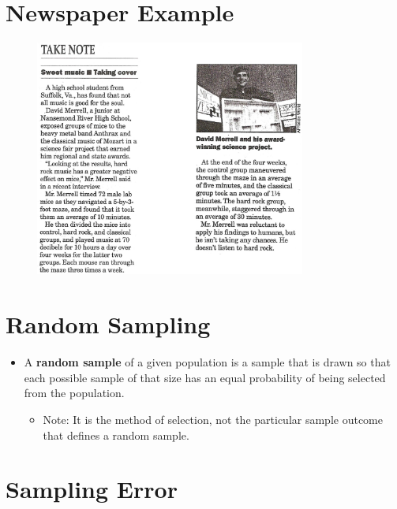 \documentclass[12pt]{article}
\begin{document}
\section{Newspaper Example}\label{newspaper-example}

\begin{figure}[H]
\centering
\includegraphics[width=3.5in]{science_project.png}
\caption{}
\end{figure}

\section{Random Sampling}\label{random-sampling}

\begin{itemize}
\itemsep1pt\parskip0pt
\item
  A \textbf{random sample} of a given population is a sample that is
  drawn so that each possible sample of that size has an equal
  probability of being selected from the population.

  \begin{itemize}
  \itemsep1pt\parskip0pt
  \item
    Note: It is the method of selection, not the particular sample
    outcome that defines a random sample.
  \end{itemize}
\end{itemize}

\section{Sampling Error}\label{sampling-error}
\end{document}
